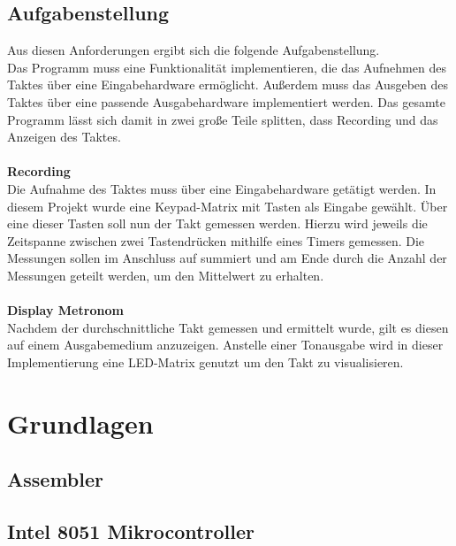 \documentclass[a4paper, 12pt]{scrartcl}
\begin{document}
\begin{onehalfspace}
\subsection{Aufgabenstellung}
Aus diesen Anforderungen ergibt sich die folgende Aufgabenstellung.
\\
Das Programm muss eine Funktionalität implementieren, die das Aufnehmen des Taktes über eine Eingabehardware ermöglicht. Außerdem muss das Ausgeben des Taktes über eine passende Ausgabehardware implementiert werden.
Das gesamte Programm lässt sich damit in zwei große Teile splitten, dass Recording und das Anzeigen des Taktes.
\\
\\
\textbf{Recording}
\\
Die Aufnahme des Taktes muss über eine Eingabehardware getätigt werden. In diesem Projekt wurde eine Keypad-Matrix mit Tasten als Eingabe gewählt. Über eine dieser Tasten soll nun der Takt gemessen werden. Hierzu wird jeweils die Zeitspanne zwischen zwei Tastendrücken mithilfe eines Timers gemessen. Die Messungen sollen im Anschluss auf summiert und am Ende durch die Anzahl der Messungen geteilt werden, um den Mittelwert zu erhalten.
\\
\\
\textbf{Display Metronom}
\\
Nachdem der durchschnittliche Takt gemessen und ermittelt wurde, gilt es diesen auf einem Ausgabemedium anzuzeigen. Anstelle einer Tonausgabe wird in dieser Implementierung eine LED-Matrix genutzt um den Takt zu visualisieren.
\newpage
\section{Grundlagen}
\subsection{Assembler}
\subsection{Intel 8051 Mikrocontroller}

\end{onehalfspace}
\end{document}
